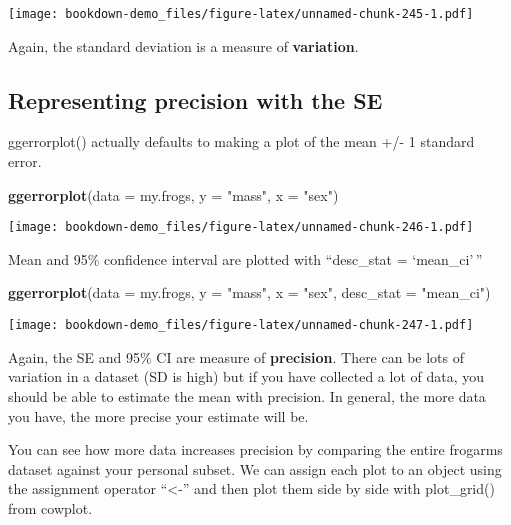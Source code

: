 \documentclass[]{book}
\newenvironment{Shaded}{\begin{snugshade}}{\end{snugshade}}
\newcommand{\KeywordTok}[1]{\textcolor[rgb]{0.13,0.29,0.53}{\textbf{#1}}}
\newcommand{\DataTypeTok}[1]{\textcolor[rgb]{0.13,0.29,0.53}{#1}}
\newcommand{\StringTok}[1]{\textcolor[rgb]{0.31,0.60,0.02}{#1}}
\newcommand{\NormalTok}[1]{#1}
\theoremstyle{definition}
\theoremstyle{definition}
\theoremstyle{definition}
\theoremstyle{remark}
\begin{document}
\texttt{[image: bookdown-demo\_files/figure-latex/unnamed-chunk-245-1.pdf]}

Again, the standard deviation is a measure of \textbf{variation}.

\subsection{Representing precision with the
SE}\label{representing-precision-with-the-se}

ggerrorplot() actually defaults to making a plot of the mean +/- 1
standard error.

\begin{Shaded}
\begin{Highlighting}[]
\KeywordTok{ggerrorplot}\NormalTok{(}\DataTypeTok{data =}\NormalTok{ my.frogs,}
          \DataTypeTok{y =} \StringTok{"mass"}\NormalTok{,}
          \DataTypeTok{x =} \StringTok{"sex"}\NormalTok{)}
\end{Highlighting}
\end{Shaded}

\texttt{[image: bookdown-demo\_files/figure-latex/unnamed-chunk-246-1.pdf]}

Mean and 95\% confidence interval are plotted with ``desc\_stat =
`mean\_ci'\,''

\begin{Shaded}
\begin{Highlighting}[]
\KeywordTok{ggerrorplot}\NormalTok{(}\DataTypeTok{data =}\NormalTok{ my.frogs,}
          \DataTypeTok{y =} \StringTok{"mass"}\NormalTok{,}
          \DataTypeTok{x =} \StringTok{"sex"}\NormalTok{,}
          \DataTypeTok{desc_stat =} \StringTok{"mean_ci"}\NormalTok{)}
\end{Highlighting}
\end{Shaded}

\texttt{[image: bookdown-demo\_files/figure-latex/unnamed-chunk-247-1.pdf]}

Again, the SE and 95\% CI are measure of \textbf{precision}. There can
be lots of variation in a dataset (SD is high) but if you have collected
a lot of data, you should be able to estimate the mean with precision.
In general, the more data you have, the more precise your estimate will
be.

You can see how more data increases precision by comparing the entire
frogarms dataset against your personal subset. We can assign each plot
to an object using the assignment operator ``\textless{}-'' and then
plot them side by side with plot\_grid() from cowplot.
\end{document}
